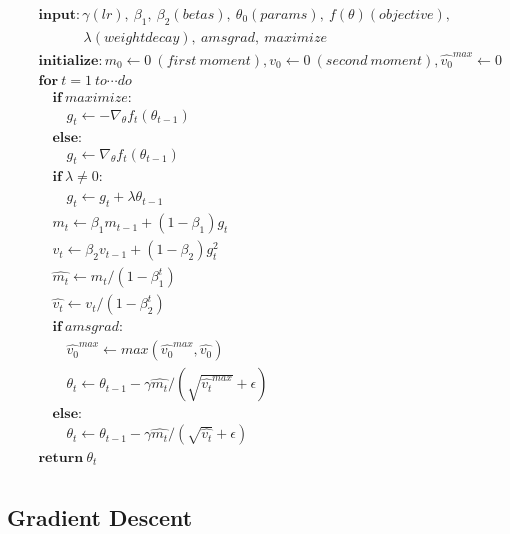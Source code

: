\begin{eqnarray}
    && \textbf{input}: \gamma(lr),\ \beta_1,\ \beta_2(betas),\ \theta_0(params),\ f(\theta)(objective),\  \nonumber \\
    && \qquad \quad \ \lambda(weight decay),\ amsgrad,\ maximize \nonumber \\
    && \textbf{initialize}: m_0 \leftarrow 0\ (first\ moment), v_0 \leftarrow 0\ (second\ moment), \hat{v_0}^{max} \leftarrow 0  \nonumber \\
    && \textbf{for}\ t=1\ to \cdots do \nonumber \\ 
    && \quad \textbf{if}\ maximize: \nonumber \\ 
    && \quad \quad  g_t \leftarrow -\nabla_\theta f_t(\theta_{t-1}) \nonumber \\ 
    && \quad \textbf{else}: \nonumber \\ 
    && \quad \quad  g_t \leftarrow \nabla_\theta f_t(\theta_{t-1}) \nonumber \\ 
    && \quad \textbf{if}\ \lambda \neq 0: \nonumber \\ 
    && \quad \quad  g_t \leftarrow g_t + \lambda \theta_{t-1} \nonumber \\ 
    && \quad  m_t \leftarrow \beta_1 m_{t-1} + (1-\beta_1)g_t  \nonumber \\ 
    && \quad  v_t \leftarrow \beta_2 v_{t-1} + (1-\beta_2)g_t^2  \nonumber \\ 
    && \quad  \hat{m_t} \leftarrow m_t / (1-\beta_1^t)  \nonumber \\ 
    && \quad  \hat{v_t} \leftarrow v_t / (1-\beta_2^t)  \nonumber \\ 
    && \quad \textbf{if}\ amsgrad: \nonumber \\ 
    && \quad \quad \hat{v_0}^{max} \leftarrow max(\hat{v_0}^{max}, \hat{v_0}) \nonumber \\ 
    && \quad \quad \theta_t \leftarrow \theta_{t-1} - \gamma \hat{m_t} /(\sqrt{\hat{v_t}^{max}} + \epsilon) \nonumber \\ 
    && \quad \textbf{else}: \nonumber \\ 
    && \quad \quad \theta_t \leftarrow \theta_{t-1} - \gamma \hat{m_t} /(\sqrt{\hat{v_t}} + \epsilon) \nonumber \\ 
    && \textbf{return} \ \theta_t \nonumber \\ 
\end{eqnarray}
\subsection{Gradient Descent}

